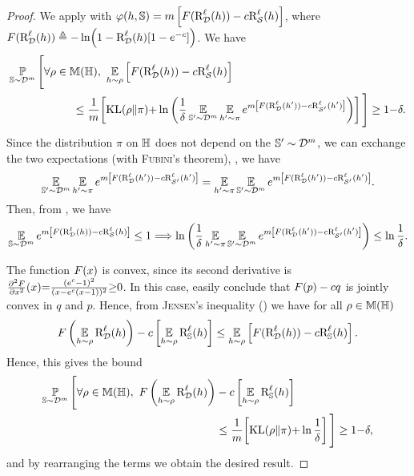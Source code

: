 \begin{noaddcontents}
\catoni*
\begin{proof}
We apply  with $\varphi(h,\mathbb{S}) = m\left[F(\text{R}^{\ell}_{\mathcal{D}}(h))-c\text{R}^{\ell}_{\mathcal{S}}(h)\right]$, where $F(\text{R}^{\ell}_{\mathcal{D}}(h))\triangleq-\ln\!\left( 1-\text{R}^{\ell}_{\mathcal{D}}(h)\!\left[1-e^{-c}\right]\right)$.
We have
\begin{align*}
    \PP_{\S\sim\D^\m}\Bigg[\forall\Q\in\M(\H),\   &\EE_{\h\sim\Q}\LB\catF(\RiskLoss_{\D}(\h))-\cat\RiskLoss_{\dS}(\h)\RB\\
    &\hspace{-1cm}\le \frac{1}{\m}\!\LB\KL(\Q\|\P){+}\ln\LP\frac{1}{\delta}\EE_{\S'\sim\D^\m}\EE_{\h'\sim\P}e^{\m\LB\catF(\RiskLoss_{\D}(\h'))-\cat\RiskLoss_{\dS'}(\h')\RB}\RP\RB\Bigg] \ge 1{-}\delta.
\end{align*}
Since the distribution $\pi$ on $\mathbb{H}$ does not depend on the $\mathbb{S}'\sim\mathcal{D}^m$, we can exchange the two expectations (with \textsc{Fubini}'s theorem), \ie, we have 
\begin{align*}
\operatorname*{\mathbb{E}}_{\mathbb{S}'\sim\mathcal{D}^m}\operatorname*{\mathbb{E}}_{h'\sim\pi}e^{m\left[F(\text{R}^{\ell}_{\mathcal{D}}(h'))-c\text{R}^{\ell}_{\mathcal{S}'}(h')\right]} = \operatorname*{\mathbb{E}}_{h'\sim\pi}\operatorname*{\mathbb{E}}_{\mathbb{S}'\sim\mathcal{D}^m}e^{m\left[F(\text{R}^{\ell}_{\mathcal{D}}(h'))-c\text{R}^{\ell}_{\mathcal{S}'}(h')\right]}.
\end{align*}
Then, from , we have
\begin{align*}
    \operatorname*{\mathbb{E}}_{\mathbb{S}\sim\mathcal{D}^m}e^{m\left[F(\text{R}^{\ell}_{\mathcal{D}}(h))-c\text{R}^{\ell}_{\mathcal{S}}(h)\right]} \le 1 \Longrightarrow  \ln\left(\frac{1}{\delta}\operatorname*{\mathbb{E}}_{h'\sim\pi}\operatorname*{\mathbb{E}}_{\mathbb{S}'\sim\mathcal{D}^m}e^{m\left[F(\text{R}^{\ell}_{\mathcal{D}}(h'))-c\text{R}^{\ell}_{\mathcal{S}'}(h')\right]}\right) \le \ln\frac{1}{\delta}.
\end{align*}

The function $F(x)$ is convex, since its second derivative is $\frac{\partial^2F}{\partial x^2}(x) {=} \frac{(e^c-1)^2}{(x-e^c(x-1))^2}{\ge} 0$.
In this case, easily conclude that $F(p)-c q$ is jointly convex in $q$ and $p$.
Hence, from \textsc{Jensen}'s inequality () we have for all $\rho\in\mathbb{M}(\mathbb{H})$
\begin{align*}
F\left(\operatorname*{\mathbb{E}}_{h\sim\rho}\text{R}^{\ell}_{\mathcal{D}}(h)\right)-c\left[\operatorname*{\mathbb{E}}_{h\sim\rho}\text{R}^{\ell}_{\mathbb{S}}(h)\right] \le \operatorname*{\mathbb{E}}_{h\sim\rho}\left[ F(\text{R}^{\ell}_{\mathcal{D}}(h))-c\text{R}^{\ell}_{\mathbb{S}}(h) \right].
\end{align*}
Hence, this gives the bound 
\begin{align*}
    \PP_{\S\sim\D^\m}\Bigg[\forall\Q\in\M(\H),\ \catF\LP\EE_{\h\sim\Q}\RiskLoss_{\D}(\h)\RP&-\cat\LB\EE_{\h\sim\Q}\RiskLoss_{\S}(\h)\RB\\
    &\le \frac{1}{\m}\!\LB\KL(\Q\|\P){+}\ln\frac{1}{\delta}\RB\Bigg] \ge 1{-}\delta,
\end{align*}
and by rearranging the terms we obtain the desired result.
\end{proof}


\end{noaddcontents}
